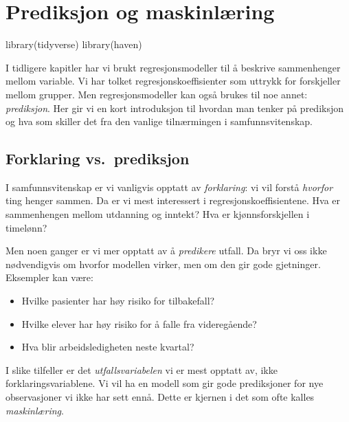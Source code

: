 \documentclass[
  norsk,
  letterpaper,
  DIV=11,
  numbers=noendperiod]{scrreprt}
\newenvironment{Shaded}{\begin{snugshade}}{\end{snugshade}}
\newcommand{\FunctionTok}[1]{\textcolor[rgb]{0.28,0.35,0.67}{#1}}
\newcommand{\NormalTok}[1]{\textcolor[rgb]{0.00,0.23,0.31}{#1}}
\providecommand{\tightlist}{%
  \setlength{\itemsep}{0pt}\setlength{\parskip}{0pt}}
\theoremstyle{definition}
\theoremstyle{remark}
\begin{document}
\chapter{Prediksjon og
maskinlæring}\label{prediksjon-og-maskinluxe6ring}

\begin{Shaded}
\begin{Highlighting}[]
\FunctionTok{library}\NormalTok{(tidyverse)}
\FunctionTok{library}\NormalTok{(haven)}
\end{Highlighting}
\end{Shaded}

I tidligere kapitler har vi brukt regresjonsmodeller til å beskrive
sammenhenger mellom variable. Vi har tolket regresjonskoeffisienter som
uttrykk for forskjeller mellom grupper. Men regresjonsmodeller kan også
brukes til noe annet: \emph{prediksjon}. Her gir vi en kort introduksjon
til hvordan man tenker på prediksjon og hva som skiller det fra den
vanlige tilnærmingen i samfunnsvitenskap.

\section{Forklaring vs.~prediksjon}\label{forklaring-vs.-prediksjon}

I samfunnsvitenskap er vi vanligvis opptatt av \emph{forklaring}: vi vil
forstå \emph{hvorfor} ting henger sammen. Da er vi mest interessert i
regresjonskoeffisientene. Hva er sammenhengen mellom utdanning og
inntekt? Hva er kjønnsforskjellen i timelønn?

Men noen ganger er vi mer opptatt av å \emph{predikere} utfall. Da bryr
vi oss ikke nødvendigvis om hvorfor modellen virker, men om den gir gode
gjetninger. Eksempler kan være:

\begin{itemize}
\tightlist
\item
  Hvilke pasienter har høy risiko for tilbakefall?
\item
  Hvilke elever har høy risiko for å falle fra videregående?
\item
  Hva blir arbeidsledigheten neste kvartal?
\end{itemize}

I slike tilfeller er det \emph{utfallsvariabelen} vi er mest opptatt av,
ikke forklaringsvariablene. Vi vil ha en modell som gir gode
prediksjoner for nye observasjoner vi ikke har sett ennå. Dette er
kjernen i det som ofte kalles \emph{maskinlæring}.
\end{document}
